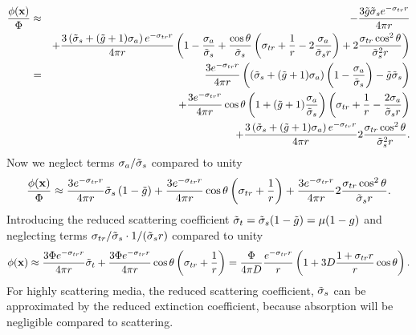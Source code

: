 \documentclass[10pt,a4paper]{article}
\begin{document}
\begin{eqnarray*}
    \frac{\phi(\mathbf{x})}{\Phi} &\approx& - \frac{3 \tilde{g} \tilde{\sigma}_s e^{- \sigma_{tr} r}}{4\pi r}
      \\
     && + \frac{3 \left(\tilde{\sigma}_s + (\tilde{g} +1) \sigma_a \right) e^{-\sigma_{tr} r} }{4\pi r}
  \left(1 -
    \frac{\sigma_a}{\tilde{\sigma}_s} + \frac{\cos \theta}{\tilde{\sigma}_s} \left(
    \sigma_{tr} + \frac{1}{r} - 2 \frac{\sigma_a}{\tilde{\sigma}_s r} \right) + 2
    \frac{\sigma_{tr} \cos^2\theta}{\tilde{\sigma}_s^2 r} \right) \\
    &=& \frac{3 e^{- \sigma_{tr} r}}{4\pi r} \left( \left(\tilde{\sigma}_s +
    (\tilde{g} +1) \sigma_a \right)  \left( 1 - \frac{\sigma_a}{\tilde{\sigma}_s}
    \right) - \tilde{g} \tilde{\sigma}_s  \right) \\
    && + \frac{3 e^{- \sigma_{tr} r}}{4\pi r} \cos \theta  \left(1 +
    (\tilde{g} +1) \frac{\sigma_a}{\tilde{\sigma}_s} \right) \left( \sigma_{tr} +
    \frac{1}{r} - \frac{2 \sigma_a}{\tilde{\sigma}_s r} \right) \\
    && + \frac{3 \left(\tilde{\sigma}_s + (\tilde{g} +1) \sigma_a \right) e^{-\sigma_{tr} r} }{4\pi r}
 2 \frac{\sigma_{tr} \cos^2\theta}{\tilde{\sigma}_s^2 r} .
\end{eqnarray*}
Now we neglect terms $\sigma_a/\tilde{\sigma}_s$ compared to unity
\begin{equation*}
   \frac{\phi(\mathbf{x})}{\Phi} \approx  \frac{3 e^{- \sigma_{tr} r}}{4\pi r} \tilde{\sigma}_s
    \left( 1 - \tilde{g} \right)
    + \frac{3 e^{- \sigma_{tr} r}}{4\pi r} \cos \theta \left( \sigma_{tr} + \frac{1}{r} \right)
    + \frac{3 e^{-\sigma_{tr} r} }{4\pi r} 2 \frac{\sigma_{tr}
    \cos^2\theta}{\tilde{\sigma}_s r}.
\end{equation*}
Introducing the reduced scattering coefficient $\tilde{\sigma}_t = \tilde{\sigma}_s ( 1 -
\tilde{g}) = \mu ( 1 - g)$ and neglecting terms $\sigma_{tr}/\tilde{\sigma}_s \cdot 1/(\tilde{\sigma}_s r)$ compared to unity
\begin{equation*}
    \phi(\mathbf{x}) \approx  \frac{3 \Phi e^{- \sigma_{tr} r}}{4\pi r} \tilde{\sigma}_t
    + \frac{3 \Phi e^{- \sigma_{tr} r}}{4\pi r} \cos \theta \left( \sigma_{tr} +
    \frac{1}{r} \right) = \frac{\Phi}{4\pi D} \frac{e^{- \sigma_{tr} r}}{ r} \left( 1 
    + 3 D \frac{1 + \sigma_{tr} r}{r} \cos \theta \right).
\end{equation*}
For highly scattering media, the reduced scattering coefficient, $\tilde{\sigma}_s$ can
be approximated by the reduced extinction coefficient, because absorption
will be negligible compared to scattering.
\end{document}
